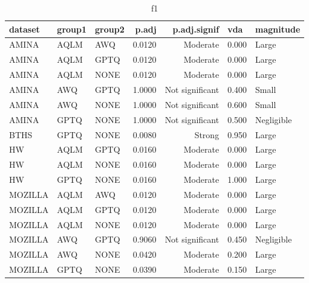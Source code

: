 \begin{table}
\centering
\caption{f1}
\begin{tabular}{lllrrll}
\toprule
dataset & group1 & group2 & p.adj & p.adj.signif & vda & magnitude \\
\midrule
AMINA & AQLM & AWQ & 0.0120 & Moderate & 0.000 & Large \\
AMINA & AQLM & GPTQ & 0.0120 & Moderate & 0.000 & Large \\
AMINA & AQLM & NONE & 0.0120 & Moderate & 0.000 & Large \\
AMINA & AWQ & GPTQ & 1.0000 & Not significant & 0.400 & Small \\
AMINA & AWQ & NONE & 1.0000 & Not significant & 0.600 & Small \\
AMINA & GPTQ & NONE & 1.0000 & Not significant & 0.500 & Negligible \\
BTHS & GPTQ & NONE & 0.0080 & Strong & 0.950 & Large \\
HW & AQLM & GPTQ & 0.0160 & Moderate & 0.000 & Large \\
HW & AQLM & NONE & 0.0160 & Moderate & 0.000 & Large \\
HW & GPTQ & NONE & 0.0160 & Moderate & 1.000 & Large \\
MOZILLA & AQLM & AWQ & 0.0120 & Moderate & 0.000 & Large \\
MOZILLA & AQLM & GPTQ & 0.0120 & Moderate & 0.000 & Large \\
MOZILLA & AQLM & NONE & 0.0120 & Moderate & 0.000 & Large \\
MOZILLA & AWQ & GPTQ & 0.9060 & Not significant & 0.450 & Negligible \\
MOZILLA & AWQ & NONE & 0.0420 & Moderate & 0.200 & Large \\
MOZILLA & GPTQ & NONE & 0.0390 & Moderate & 0.150 & Large \\
\bottomrule
\end{tabular}
\end{table}

